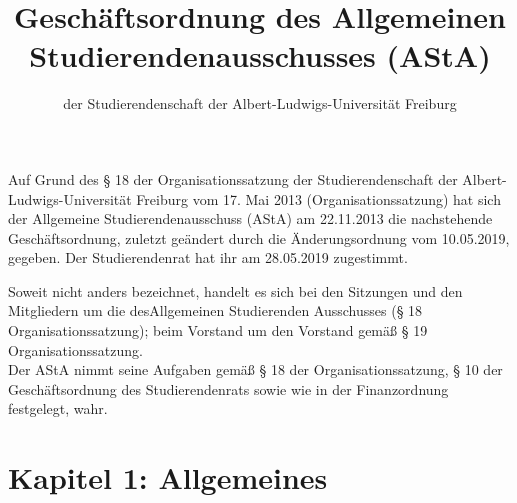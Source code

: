 \documentclass[fontsize=12pt,parskip=half, ref=short]{scrartcl}
\begin{document}
\subject{Lesefassung}
\title{Geschäftsordnung des Allgemeinen Studierendenausschusses (AStA)}
\subtitle{der Studierendenschaft der Albert-Ludwigs-Universität Freiburg}
\date{}
\maketitle

\pagebreak

\tableofcontents

\vspace*{\fill}

Auf Grund des § 18 der Organisationssatzung der Studierendenschaft der
Albert-Ludwigs-Universität Freiburg vom 17. Mai 2013 (Organisationssatzung) hat
sich der Allgemeine Studierendenausschuss (AStA) am 22.11.2013 die nachstehende
Geschäftsordnung, zuletzt geändert durch die Änderungsordnung vom  10.05.2019,
gegeben. Der Studierendenrat hat ihr am  28.05.2019 zugestimmt.

Soweit nicht anders bezeichnet, handelt es sich bei den Sitzungen und den
Mitgliedern um die desAllgemeinen Studierenden Ausschusses (§ 18
Organisationssatzung); beim Vorstand um den Vorstand gemäß § 19
Organisationssatzung.\\
Der AStA nimmt seine Aufgaben gemäß § 18 der Organisationssatzung, § 10 der
Geschäftsordnung des Studierendenrats sowie wie in der Finanzordnung festgelegt,
wahr.

\pagebreak

\section*{Kapitel 1: Allgemeines}
\end{document}

